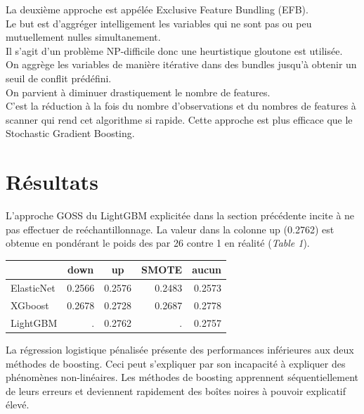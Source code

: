 \documentclass[french]{article}
\begin{document}
\begin{multicols}{2}
La deuxième approche est appélée Exclusive Feature Bundling (EFB).\\
Le but est d'aggréger intelligement les variables qui ne sont pas ou peu mutuellement nulles simultanement.\\
Il s'agit d'un problème NP-difficile donc une heurtistique gloutone est utilisée.\\
On aggrège les variables de manière itérative dans des \og bundles \fg{} jusqu'à obtenir un seuil de conflit prédéfini.\\
On parvient à diminuer drastiquement le nombre de features.\\
C'est la réduction à la fois du nombre d'observations et du nombres de features à scanner qui rend cet algorithme si rapide. Cette approche est plus efficace que le Stochastic Gradient Boosting.







\section{Résultats}

L'approche GOSS du LightGBM explicitée dans la section précédente incite à ne pas effectuer de reéchantillonnage. La valeur dans la colonne \og up \fg{} (0.2762) est obtenue en pondérant le poids des  \fg{} par 26 contre 1 en réalité (\emph{Table 1}).

\begin{center}\begin{tabular}{|l|r|r|r|r|} \hline
  & \multicolumn{1}{c|}{down} & \multicolumn{1}{c|}{up} & \multicolumn{1}{c|}{SMOTE} & \multicolumn{1}{c|}{aucun} \\ \hline
  ElasticNet & 0.2566 & 0.2576 & 0.2483 & 0.2573 \\
  XGboost & 0.2678 & 0.2728 & 0.2687 & 0.2778 \\
  LightGBM & . & 0.2762 & . & 0.2757 \\ \hline

\end{tabular}\end{center}



La régression logistique pénalisée présente des performances inférieures aux deux méthodes de boosting. Ceci peut s'expliquer par son incapacité à expliquer des phénomènes non-linéaires. Les méthodes de boosting apprennent séquentiellement de leurs erreurs et deviennent rapidement des boîtes noires à pouvoir explicatif élevé.


\end{multicols}
\end{document}
